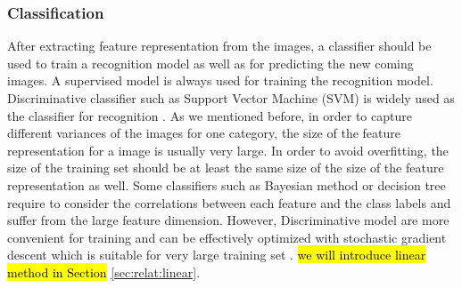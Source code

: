 \subsubsection{Classification}
After extracting feature representation from the images, a classifier should be used to train a recognition model as well as for predicting the new coming images. A supervised model is always used for training the recognition model. Discriminative classifier such as Support Vector Machine (SVM) is widely used as the classifier for recognition \cite{cristianini2000introduction}. As we mentioned before, in order to capture different variances of the images for one category, the size of the feature representation for a image is usually very large. In order to avoid overfitting, the size of the training set should be at least the same size of the size of the feature representation as well. Some classifiers such as Bayesian method or decision tree require to consider the correlations between each feature and the class labels and suffer from the large feature dimension. However, Discriminative model are more convenient for training and can be effectively optimized with stochastic gradient descent which is suitable for very large training set \cite{bottou2010large}. \hl{we will introduce linear method in Section }\ref{sec:relat:linear}.





